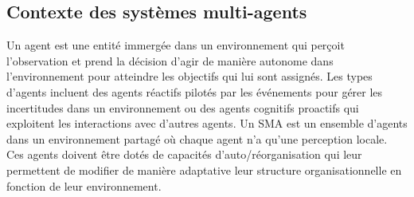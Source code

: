 \documentclass[contribution]{jfsma}
\begin{document}
\subsection{Contexte des systèmes multi-agents}


Un agent est une entité immergée dans un environnement qui perçoit l'observation et prend la décision d'agir de manière autonome dans l'environnement pour atteindre les objectifs qui lui sont assignés.
Les types d'agents incluent des agents réactifs pilotés par les événements pour gérer les incertitudes dans un environnement ou des agents cognitifs proactifs qui exploitent les interactions avec d'autres agents. Un SMA est un ensemble d'agents dans un environnement partagé où chaque agent n'a qu'une perception locale. Ces agents doivent être dotés de capacités d'auto/réorganisation qui leur permettent de modifier de manière adaptative leur structure organisationnelle en fonction de leur environnement.
\end{document}
